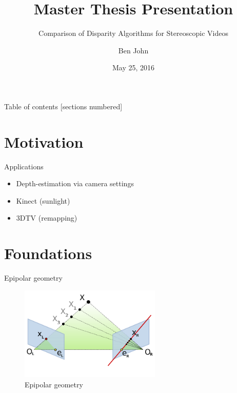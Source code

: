 \documentclass[10pt]{beamer}
\title{Master Thesis Presentation}
\subtitle{Comparison of Disparity Algorithms for Stereoscopic Videos}
\date{May 25, 2016}
\author{Ben John}
\institute{University of Mannheim, Department of Praktische Informatik IV}
\begin{document}
\maketitle

\begin{frame}{Table of contents}
  [sections numbered]
  \tableofcontents[hideallsubsections]
\end{frame}

\section{Motivation}

\begin{frame}[fragile]{Applications}
  \begin{itemize}
    \item Depth-estimation via camera settings
    \item Kinect (sunlight)
    \item 3DTV (remapping)
  \end{itemize}
\end{frame}

\section{Foundations}

\begin{frame}[fragile]{Epipolar geometry}
  \begin{figure}[h!]
    \centering
    \includegraphics[width=0.6\textwidth]{../paper/src/images/epipolar.png}
    \caption[Epipolar geometry]{Epipolar geometry\protect\footnotemark}
  \end{figure}
\end{frame}
\end{document}
